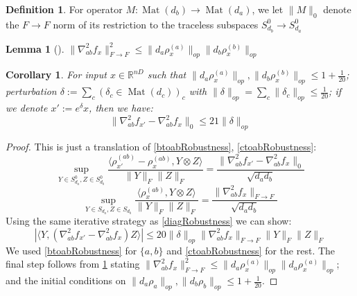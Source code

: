 \documentclass[aos]{imsart}
\newtheorem{corollary}[theorem]{Corollary}
\newtheorem{lemma}[theorem]{Lemma}
\theoremstyle{definition}
\newtheorem*{definition}{Definition}
\numberwithin{equation}{section}
\DeclareMathOperator{\mat}{Mat}
\newcommand{\R}{{\mathbb{R}}}
\newcommand{\smallSym}{S}
\newcommand{\samp}{x}
\newcommand{\AR}[1]{{\color{orange}[AR: #1]}}
\begin{document}
\begin{appendix}
\begin{definition}
For operator $M : \mat(d_{b}) \to \mat(d_{a})$, we let $\|M\|_{0}$ denote the $F \to F$ norm of its restriction to the traceless subspaces $\smallSym^0_{d_b} \to \smallSym^0_{d_a}$
\end{definition}

\begin{lemma}[\cite{KLR19}] \label{inftyto2}
$\|\nabla^{2}_{ab} f_{\samp}\|_{F \to F}^{2} \leq \|d_{a} \rho_{\samp}^{(a)}\|_{op} \|d_{b} \rho_{\samp}^{(b)}\|_{op}$
\end{lemma}

\begin{corollary} \label{offdiagRobustness}
For input $\samp \in \R^{nD}$ such that $\|d_{a} \rho_{\samp}^{(a)}\|_{op}, \|d_{b} \rho_{\samp}^{(b)}\|_{op} \leq 1+\frac{1}{20}$; perturbation $\delta := \sum_{c} (\delta_{c} \in \mat(d_{c}))_{c}$ with $\|\delta\|_{op} = \sum_{c} \|\delta_{c}\|_{op} \leq \frac{1}{20}$; if we denote $\samp' := e^{\delta} \samp$, then we have:
\[ \|\nabla^{2}_{ab} f_{\samp'} - \nabla^{2}_{ab} f_{\samp}\|_{0} \leq 21 \|\delta\|_{op}  \]
\end{corollary}
\begin{proof}
This is just a translation of \cref{btoabRobustness}, \cref{ctoabRobustness}:
\[ \sup_{Y \in \smallSym_{d_{a}}^{0}, Z \in \smallSym_{d_{b}}^{0}} \frac{\langle \rho_{\samp'}^{(ab)} - \rho_{\samp}^{(ab)}, Y \otimes Z \rangle}{\|Y\|_{F} \|Z\|_{F}} = \frac{\|\nabla^{2}_{ab} f_{\samp'} - \nabla^{2}_{ab} f_{\samp}\|_{0}}{\sqrt{d_{a} d_{b}} } \]
\[ \sup_{Y \in \smallSym_{d_{a}}, Z \in \smallSym_{d_{b}}} \frac{\langle \rho_{\samp}^{(ab)}, Y \otimes Z \rangle}{\|Y\|_{F} \|Z\|_{F}} = \frac{\|\nabla^{2}_{ab} f_{\samp}\|_{F \to F}}{\sqrt{d_{a} d_{b}} }       \]
Using the same iterative strategy as \cref{diagRobustness} we can show:
\[ |\langle Y, (\nabla^{2}_{ab} f_{\samp'} - \nabla^{2}_{ab} f_{\samp}) Z \rangle| \leq 20 \|\delta\|_{op} \|\nabla^{2}_{ab} f_{\samp}\|_{F \to F} \|Y\|_{F} \|Z\|_{F}    \]
We used \cref{btoabRobustness} for $\{a,b\}$ and \cref{ctoabRobustness} for the rest. The final step follows from \cref{inftyto2} stating $\|\nabla^{2}_{ab} f_{\samp}\|_{F \to F}^{2} \leq \|d_{a} \rho_{\samp}^{(a)}\|_{op} \|d_{a} \rho_{\samp}^{(a)}\|_{op}$; and the initial conditions on $\|d_{a} \rho_{a}\|_{op}, \|d_{b} \rho_{b}\|_{op} \leq 1 + \frac{1}{20}$.
\end{proof}


\end{appendix}
\end{document}
